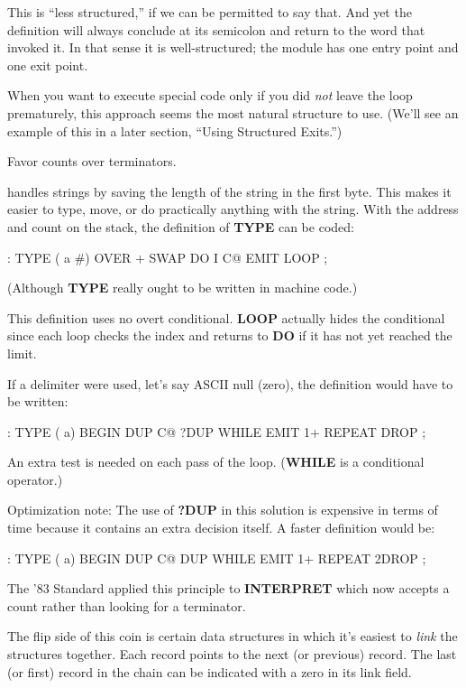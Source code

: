This is ``less structured,'' if we can be permitted to say that. And
yet the definition will always conclude at its semicolon and return to the
word that invoked it. In that sense it is well-structured; the module has
one entry point and one exit point.

When you want to execute special code only if you did \emph{not} leave the
loop prematurely, this approach seems the most natural structure to use.
(We'll see an example of this in a later section, ``Using Structured
Exits.'')

\begin{tip}
Favor counts over terminators.
\end{tip}
\Forth{} handles strings by saving the length of the string in the first
byte. This makes it easier to type, move, or do practically anything with
the string. With the address and count on the stack, the definition of
\textbf{TYPE} can be coded:

\begin{Code}
: TYPE  ( a #)  OVER + SWAP DO  I C@ EMIT  LOOP ;
\end{Code}
(Although \textbf{TYPE} really ought to be written in machine code.)

This definition uses no overt conditional. \textbf{LOOP} actually hides the
conditional since each loop checks the index and returns to \textbf{DO} if it
has not yet reached the limit.

If a delimiter were used, let's say ASCII null (zero), the definition
would have to be written:

\begin{Code}
: TYPE  ( a)  BEGIN DUP C@  ?DUP WHILE  EMIT  1+
   REPEAT  DROP ;
\end{Code}
An extra test is needed on each pass of the loop. (\textbf{WHILE} is a conditional
operator.)

Optimization note: The use of \textbf{?DUP} in this solution is expensive in
terms of time because it contains an extra decision itself. A faster
definition would be:

\begin{Code}
: TYPE  ( a)  BEGIN DUP C@  DUP WHILE EMIT 1+
    REPEAT  2DROP ;
\end{Code}
The '83 Standard applied this principle to \textbf{INTERPRET} which now accepts
a count rather than looking for a terminator.

The flip side of this coin is certain data structures in which it's
easiest to \emph{link} the structures together. Each record points to the next
(or previous) record. The last (or first) record in the chain can be indicated
with a zero in its link field.

